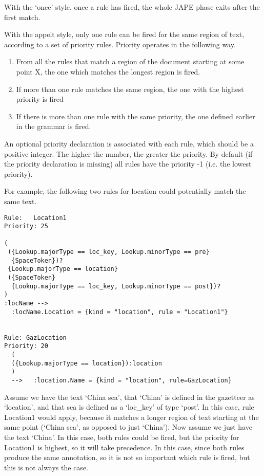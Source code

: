 With the `once' style, once a rule has fired, the whole JAPE phase exits after
the first match.

With the appelt style, only one rule can be fired for the same region
of text, according to a set of priority rules. Priority operates in the
following way.
%
\begin{enumerate}
\item  From all the rules that match a region of the document starting at some
point X, the one which matches the longest region is fired.
\item If more than one rule matches the same region, the one with
the highest priority is fired
\item If there is more than one rule with the same priority, the one
defined earlier in the grammar is fired.
%
\end{enumerate}

An optional priority declaration is associated with each rule, which should
be a positive integer. The higher the number, the greater the priority.
By default (if the priority declaration is missing) all rules have the
priority -1 (i.e. the lowest priority).

For example, the following two rules for location could potentially match the
same text.

\begin{small}
\begin{verbatim}
Rule:   Location1
Priority: 25

(
 ({Lookup.majorType == loc_key, Lookup.minorType == pre}
  {SpaceToken})?
 {Lookup.majorType == location}
 ({SpaceToken}
  {Lookup.majorType == loc_key, Lookup.minorType == post})?
)
:locName -->
  :locName.Location = {kind = "location", rule = "Location1"}


Rule: GazLocation
Priority: 20
  (
  ({Lookup.majorType == location}):location
  )
  -->   :location.Name = {kind = "location", rule=GazLocation}
\end{verbatim}
\end{small}

Assume we have the text `China sea', that `China'
is defined in the gazetteer as `location', and that sea is defined as
a `loc\_key' of type `post'. In this case, rule Location1 would apply,
because it matches a longer region of text starting at the same point
(`China sea', as opposed to just `China'). Now assume we just have the
text `China'. In this case, both rules could be fired, but the
priority for Location1 is highest, so it will take precedence. In this
case, since both rules produce the same annotation, so it is not so
important which rule is fired, but this is not always the case.

